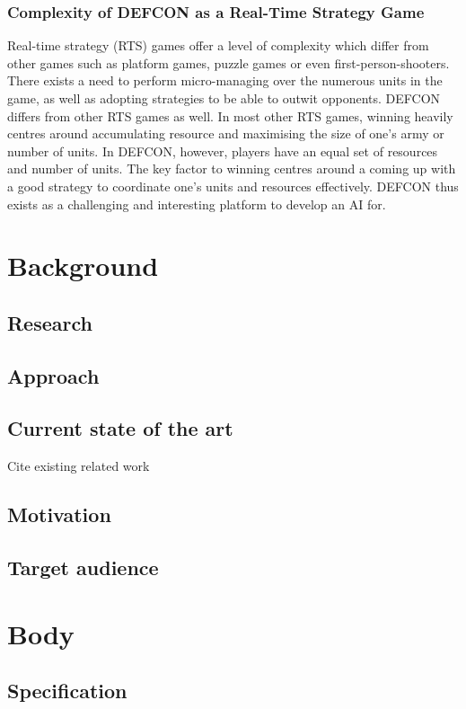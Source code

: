 \documentclass{icldt}
\begin{document}
	\subsection{Complexity of DEFCON as a Real-Time Strategy Game}
    Real-time strategy (RTS) games offer a level of complexity which differ from other games such as platform games, puzzle games or even first-person-shooters. There exists a need to perform micro-managing over the numerous units in the game, as well as adopting strategies to be able to outwit opponents. DEFCON differs from other RTS games as well. In most other RTS games, winning heavily centres around accumulating resource and maximising the size of one's army or number of units. In DEFCON, however, players have an equal set of resources and number of units. The key factor to winning centres around a coming up with a good strategy to coordinate one's units and resources effectively. DEFCON thus exists as a challenging and interesting platform to develop an AI for.
\chapter{Background}
\section{Research}
\section{Approach}
\section{Current state of the art}

Cite existing related work

\section{Motivation}
\section{Target audience}
\chapter{Body}
\section{Specification}
\end{document}
